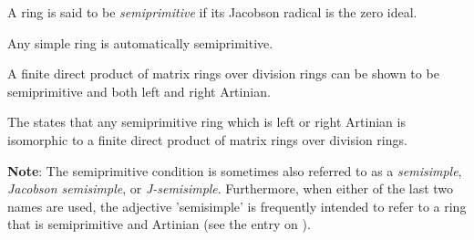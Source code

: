 \documentclass[12pt]{article}
\begin{document}

A ring is said to be \emph{semiprimitive} if its Jacobson radical is the zero ideal.

Any simple ring is automatically semiprimitive.

A finite direct product of matrix rings over division rings can be shown to be semiprimitive and both left and right Artinian.

The  states that any semiprimitive ring which is left or right Artinian is isomorphic to a finite direct product of matrix rings over division rings.

{\bf Note}:
The semiprimitive condition is sometimes also referred to as a \emph{semisimple}, \emph{Jacobson semisimple}, or \emph{J-semisimple}.  Furthermore, when either of the last two names are used, the adjective 'semisimple' is frequently intended to refer to a ring that is semiprimitive and Artinian (see the entry on ).
\end{document}
